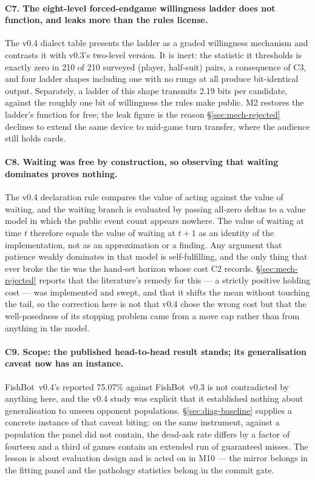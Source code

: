 \documentclass[11pt]{article}
\theoremstyle{definition}
\DeclareRobustCommand{\vfour}{\texorpdfstring{\mbox{FishBot v0.4}}{FishBot v0.4}}
\DeclareRobustCommand{\vthree}{\texorpdfstring{\mbox{FishBot v0.3}}{FishBot v0.3}}
\providecommand{\numRungZeroPairs}{210}
\providecommand{\numLadderLeak}{2.19}
\providecommand{\numVfourVsVthree}{75.07}
\begin{document}
\paragraph{C7. The eight-level forced-endgame willingness ladder does not
function, and leaks more than the rules license.} The v0.4 dialect table presents
the ladder as a graded willingness mechanism and contrasts it with v0.3's
two-level version. It is inert: the statistic it thresholds is exactly zero in
\numRungZeroPairs{} of \numRungZeroPairs{} surveyed (player, half-suit) pairs, a
consequence of C3, and four ladder shapes including one with no rungs at all
produce bit-identical output. Separately, a ladder of this shape transmits
\numLadderLeak{} bits per candidate, against the roughly one bit of willingness
the rules make public. M2 restores the ladder's function for free; the leak
figure is the reason \S\ref{sec:mech-rejected} declines to extend the same device
to mid-game turn transfer, where the audience still holds cards.

\paragraph{C8. Waiting was free by construction, so observing that waiting
dominates proves nothing.} The v0.4 declaration rule compares the value of acting
against the value of waiting, and the waiting branch is evaluated by passing
all-zero deltas to a value model in which the public event count appears nowhere.
The value of waiting at time $t$ therefore equals the value of waiting at $t+1$
as an identity of the implementation, not as an approximation or a finding. Any
argument that patience weakly dominates in that model is self-fulfilling, and the
only thing that ever broke the tie was the hand-set horizon whose cost C2
records. \S\ref{sec:mech-rejected} reports that the literature's remedy for this
--- a strictly positive holding cost --- was implemented and swept, and that it
shifts the mean without touching the tail, so the correction here is not that
v0.4 chose the wrong cost but that the well-posedness of its stopping problem
came from a move cap rather than from anything in the model.

\paragraph{C9. Scope: the published head-to-head result stands; its
generalisation caveat now has an instance.} \vfour{}'s reported
\numVfourVsVthree\% against \vthree{} is not contradicted by anything here, and
the v0.4 study was explicit that it established nothing about generalisation to
unseen opponent populations. \S\ref{sec:diag-baseline} supplies a concrete
instance of that caveat biting: on the same instrument, against a population the
panel did not contain, the dead-ask rate differs by a factor of fourteen and a
third of games contain an extended run of guaranteed misses. The lesson is about
evaluation design and is acted on in M10 --- the mirror belongs in the fitting
panel and the pathology statistics belong in the commit gate.
\end{document}
